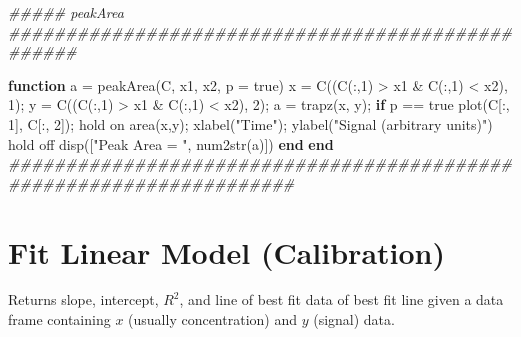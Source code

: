 \documentclass[]{tufte-book}
\newenvironment{Shaded}{}{}
\newcommand{\CommentTok}[1]{\textcolor[rgb]{0.38,0.63,0.69}{\textit{#1}}}
\newcommand{\ControlFlowTok}[1]{\textcolor[rgb]{0.00,0.44,0.13}{\textbf{#1}}}
\newcommand{\FloatTok}[1]{\textcolor[rgb]{0.25,0.63,0.44}{#1}}
\newcommand{\FunctionTok}[1]{\textcolor[rgb]{0.02,0.16,0.49}{#1}}
\newcommand{\NormalTok}[1]{#1}
\newcommand{\OperatorTok}[1]{\textcolor[rgb]{0.40,0.40,0.40}{#1}}
\newcommand{\StringTok}[1]{\textcolor[rgb]{0.25,0.44,0.63}{#1}}
\begin{document}
\begin{Shaded}
\begin{Highlighting}[]
\CommentTok{#####   peakArea   ##################################################}

\ControlFlowTok{function}\NormalTok{ a }\OperatorTok{=}\NormalTok{ peakArea(C}\OperatorTok{,}\NormalTok{ x1}\OperatorTok{,}\NormalTok{ x2}\OperatorTok{,}\NormalTok{ p }\OperatorTok{=} \FunctionTok{true}\NormalTok{)}
\NormalTok{    x }\OperatorTok{=}\NormalTok{ C((C(}\OperatorTok{:,}\FloatTok{1}\NormalTok{) }\OperatorTok{>}\NormalTok{ x1 }\OperatorTok{&}\NormalTok{ C(}\OperatorTok{:,}\FloatTok{1}\NormalTok{) }\OperatorTok{<}\NormalTok{ x2)}\OperatorTok{,} \FloatTok{1}\NormalTok{)}\OperatorTok{;}
\NormalTok{    y }\OperatorTok{=}\NormalTok{ C((C(}\OperatorTok{:,}\FloatTok{1}\NormalTok{) }\OperatorTok{>}\NormalTok{ x1 }\OperatorTok{&}\NormalTok{ C(}\OperatorTok{:,}\FloatTok{1}\NormalTok{) }\OperatorTok{<}\NormalTok{ x2)}\OperatorTok{,} \FloatTok{2}\NormalTok{)}\OperatorTok{;}
\NormalTok{    a }\OperatorTok{=} \FunctionTok{trapz}\NormalTok{(x}\OperatorTok{,}\NormalTok{ y)}\OperatorTok{;}
    \ControlFlowTok{if}\NormalTok{ p }\OperatorTok{==} \FunctionTok{true}
        \FunctionTok{plot}\NormalTok{(C[}\OperatorTok{:,} \FloatTok{1}\NormalTok{]}\OperatorTok{,}\NormalTok{ C[}\OperatorTok{:,} \FloatTok{2}\NormalTok{])}\OperatorTok{;}
        \FunctionTok{hold}\NormalTok{ on}
        \FunctionTok{area}\NormalTok{(x}\OperatorTok{,}\NormalTok{y)}\OperatorTok{;}
        \FunctionTok{xlabel}\NormalTok{(}\StringTok{"Time"}\NormalTok{)}\OperatorTok{;}
        \FunctionTok{ylabel}\NormalTok{(}\StringTok{"Signal (arbitrary units)"}\NormalTok{)}
        \FunctionTok{hold}\NormalTok{ off}
        \FunctionTok{disp}\NormalTok{([}\StringTok{"Peak Area = "}\OperatorTok{,} \FunctionTok{num2str}\NormalTok{(a)])}
    \ControlFlowTok{end}
\ControlFlowTok{end}
\CommentTok{#####################################################################}
\end{Highlighting}
\end{Shaded}

\hypertarget{fit-linear-model-calibration}{%
\section*{Fit Linear Model (Calibration)}\label{fit-linear-model-calibration}}

Returns slope, intercept, \(R^2\), and line of best fit data of best fit line given a data frame containing \(x\) (usually concentration) and \(y\) (signal) data.
\end{document}
